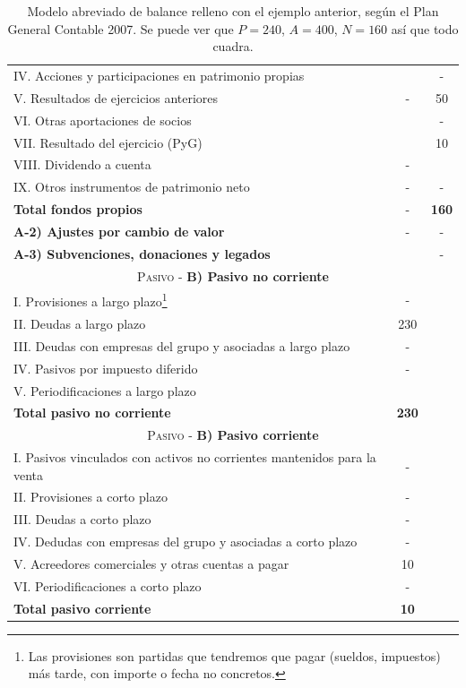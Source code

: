\documentclass[nochap,palatino,notitlepage]{apuntes}
\begin{document}
\begin{table}[hbtp]
\begin{minipage}{\textwidth}
\begin{tabular}{l|c|c}
IV. Acciones y participaciones en patrimonio propias & & - \\
V. Resultados de ejercicios anteriores & - & 50 \\
VI. Otras aportaciones de socios & & - \\
VII. Resultado del ejercicio (PyG) & & 10 \\
VIII. Dividendo a cuenta & - &\\
IX. Otros instrumentos de patrimonio neto & - & - \\
\textbf{Total fondos propios} & - &  \textbf{160} \\
\textbf{A-2) Ajustes por cambio de valor} & - & - \\
\textbf{A-3) Subvenciones, donaciones y legados} & & - \\ \midrule
\multicolumn{3}{c}{\textsc{Pasivo} - \textbf{B) Pasivo no corriente}} \\ \midrule
I. Provisiones a largo plazo\footnote{Las provisiones son partidas que tendremos que pagar (sueldos, impuestos) más tarde, con importe o fecha no concretos.} & - &  \\
II. Deudas a largo plazo & 230 & \\
III. Deudas con empresas del grupo y asociadas a largo plazo & - &  \\
IV. Pasivos por impuesto diferido & - &  \\
V. Periodificaciones a largo plazo &  & \\
\textbf{Total pasivo no corriente} & \textbf{230} &  \\ \midrule
\multicolumn{3}{c}{\textsc{Pasivo} - \textbf{B) Pasivo corriente}} \\ \midrule
I. Pasivos vinculados con activos no corrientes mantenidos para la venta & - & \\
II. Provisiones a corto plazo & - & \\
III. Deudas a corto plazo  & - & \\
IV. Dedudas con empresas del grupo y asociadas a corto plazo & - & \\
V. Acreedores comerciales y otras cuentas a pagar & 10 & \\
VI. Periodificaciones a corto plazo & - & \\
\textbf{Total pasivo corriente} & \textbf{10} &  \\ \midrule
\end{tabular}
\caption{Modelo abreviado de balance relleno con el ejemplo anterior, según el Plan General Contable 2007. Se puede ver que $P = 240$, $A = 400$, $N = 160$ así que todo cuadra.}
\label{tab:Balance}
\end{minipage}
\end{table}
\end{document}
